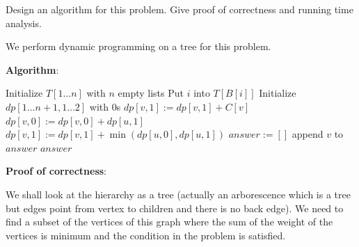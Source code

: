 \documentclass[answers]{exam}
\begin{document}
\begin{questions}
Design an algorithm for this problem. Give proof of correctness and running time analysis.

\begin{solution}

We perform dynamic programming on a tree for this problem.

    \textbf{Algorithm}:

    \begin{algorithmic}
            \State Initialize $T[1 \ldots n]$ with $n$ empty lists
                \State Put $i$ into $T[B[i]]$
            \EndFor
            \State Initialize $dp[1 \ldots n + 1, 1 \ldots 2]$ with 0s
            \State {}
            \State {}
                    \State {}
                \EndFor
                $dp[v, 1] := dp[v, 1] + C[v]$
                    \State $dp[v, 0] := dp[v, 0] + dp[u, 1]$
                    \State $dp[v, 1] := dp[v, 1] + \min(dp[u, 0], dp[u, 1])$
                \EndFor
            \EndFunction
            \State {}
            \State $answer := []$
                    \State append $v$ to $answer$
                            \State {}
                        \Else
                            \State {}
                        \EndIf
                    \EndFor
                \Else
                        \State {}
                    \EndFor
                \EndIf
            \EndFunction
                \State {}
            \Else
                \State {}
            \EndIf
            \State \Return $answer$
        \EndFunction
    \end{algorithmic}

    \textbf{Proof of correctness}:

We shall look at the hierarchy as a tree (actually an arborescence which is a tree but edges point from vertex to children and there is no back edge).
We need to find a subset of the vertices of this graph where the sum of the weight of the vertices is minimum and the condition in the problem is satisfied.


\end{solution}
\end{questions}
\end{document}
